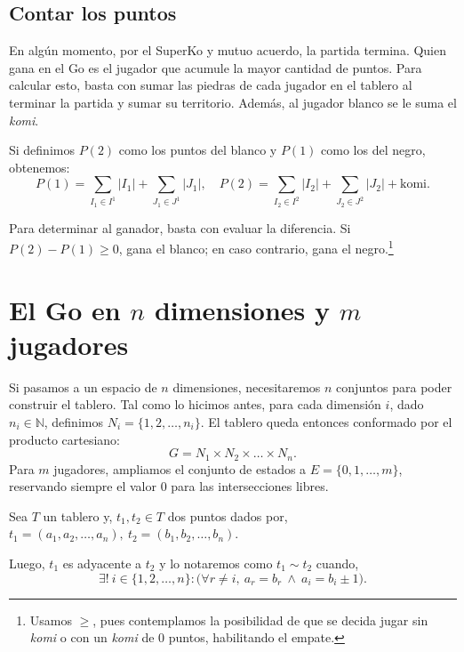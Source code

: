 \subsection{Contar los puntos}\label{contarpuntos}

En algún momento, por el SuperKo y mutuo acuerdo, la partida termina. Quien gana en el Go es el jugador que acumule la mayor cantidad de puntos. Para calcular esto, basta con sumar las piedras de cada jugador en el tablero al terminar la partida y sumar su territorio. Además, al jugador blanco se le suma el \textit{komi}.

Si definimos $P(2)$ como los puntos del blanco y $P(1)$ como los del negro, obtenemos:
\[P(1) = \sum_{I_1 \in I^{1}} |I_{1}| + \sum_{J_1 \in J^{1}} |J_{1}|, \quad P(2) = \sum_{I_2 \in I^{2}} |I_2| + \sum_{J_2 \in J^{2}} |J_{2}| + \text{komi}.\]

Para determinar al ganador, basta con evaluar la diferencia. Si $P(2) - P(1)\geq 0$, gana el blanco; en caso contrario, gana el negro.\footnote{Usamos $\geq$, pues contemplamos la posibilidad de que se decida jugar sin \textit{komi} o con un \textit{komi} de $0$ puntos, habilitando el empate.}

\section{El Go en \texorpdfstring{$n$}{n} dimensiones y \texorpdfstring{$m$}{m} jugadores}\label{Go_n_m}

Si pasamos a un espacio de $n$ dimensiones, necesitaremos $n$ conjuntos para poder construir el tablero. Tal como lo hicimos antes, para cada dimensión $i$, dado $n_i \in \mathbb{N}$, definimos $N_i = \{1, 2, \dots, n_i\}$. El tablero queda entonces conformado por el producto cartesiano:
\[ G = N_1 \times N_2 \times \dots \times N_n. \]
Para  $m$ jugadores, ampliamos el conjunto de estados a $E = \{0, 1, \dots, m\}$, reservando siempre el valor $0$ para las intersecciones libres.

\begin{definition}
	Sea $T$ un tablero y, $t_1, t_2 \in T$ dos puntos dados por, $t_1 = (a_1, a_2, \dots, a_n),\ t_2 = (b_1, b_2, \dots, b_n).$
	
	Luego, $t_1$ es adyacente a $t_2$ y lo notaremos como $t_1 \sim t_2$ cuando,
	\[\exists! \ i \in \{1, 2, \dots, n\} : \big( \forall r \neq i, \ a_r = b_r \ \land \ a_i = b_i \pm 1 \big). \]
\end{definition}

